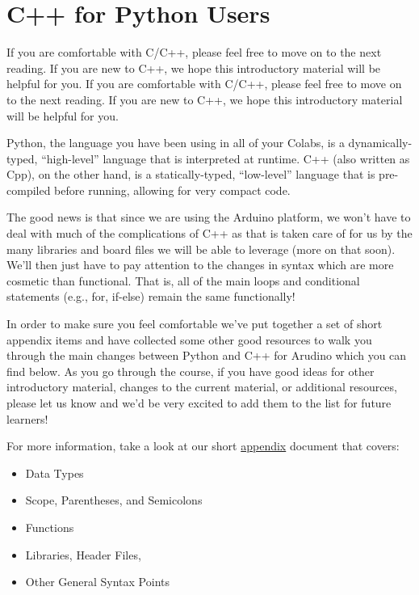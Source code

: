 \section{C++ for Python Users}

If you are comfortable with C/C++, please feel free to move on to the next reading. If you are new to C++, we hope this introductory material will be helpful for you. If you are comfortable with C/C++, please feel free to move on to the next reading. If you are new to C++, we hope this introductory material will be helpful for you.

Python, the language you have been using in all of your Colabs, is a dynamically-typed, “high-level” language that is interpreted at runtime. C++ (also written as Cpp), on the other hand, is a statically-typed, “low-level” language that is pre-compiled before running, allowing for very compact code. 

The good news is that since we are using the Arduino platform, we won’t have to deal with much of the complications of C++ as that is taken care of for us by the many libraries and board files we will be able to leverage (more on that soon). We’ll then just have to pay attention to the changes in syntax which are more cosmetic than functional. That is, all of the main loops and conditional statements (e.g., for, if-else) remain the same functionally!

In order to make sure you feel comfortable we’ve put together a set of short appendix items and have collected some other good resources to walk you through the main changes between Python and C++ for Arudino which you can find below. As you go through the course, if you have good ideas for other introductory material, changes to the current material, or additional resources, please let us know and we’d be very excited to add them to the list for future learners!

For more information, take a look at our short \href{https://github.com/tinyMLx/appendix/blob/main/CppForPythonProgrammers.md}{appendix} document that covers:

\begin{itemize}
  \item Data Types
  \item Scope, Parentheses, and Semicolons
  \item Functions
  \item Libraries, Header Files, 
  \item Other General Syntax Points
\end{itemize}


